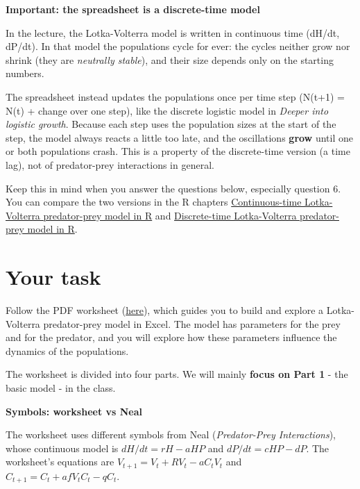 \documentclass[
  a4paper]{book}
\begin{document}
\textbf{Important: the spreadsheet is a discrete-time model}

In the lecture, the Lotka-Volterra model is written in continuous time (dH/dt, dP/dt). In that model the populations cycle for ever: the cycles neither grow nor shrink (they are \emph{neutrally stable}), and their size depends only on the starting numbers.

The spreadsheet instead updates the populations once per time step (N(t+1) = N(t) + change over one step), like the discrete logistic model in \emph{Deeper into logistic growth}. Because each step uses the population sizes at the start of the step, the model always reacts a little too late, and the oscillations \textbf{grow} until one or both populations crash. This is a property of the discrete-time version (a time lag), not of predator-prey interactions in general.

Keep this in mind when you answer the questions below, especially question 6. You can compare the two versions in the R chapters \href{continuous-time-lotka-volterra-predator-prey-model-in-r.html}{Continuous-time Lotka-Volterra predator-prey model in R} and \href{discrete-time-lotka-volterra-predator-prey-model-in-r.html}{Discrete-time Lotka-Volterra predator-prey model in R}.

\section{Your task}\label{your-task-18}

Follow the PDF worksheet (\href{https://www.dropbox.com/s/bhwoe161wp9p6hp/10.\%20Predator-prey\%20dynamics.pdf?dl=1}{here}), which guides you to build and explore a Lotka-Volterra predator-prey model in Excel. The model has parameters for the prey and for the predator, and you will explore how these parameters influence the dynamics of the populations.

The worksheet is divided into four parts. We will mainly \textbf{focus on Part 1} - the basic model - in the class.

\textbf{Symbols: worksheet vs Neal}

The worksheet uses different symbols from Neal (\emph{Predator-Prey Interactions}), whose continuous model is \(dH/dt = rH - aHP\) and \(dP/dt = cHP - dP\). The worksheet's equations are \(V_{t+1} = V_t + RV_t - aC_tV_t\) and \(C_{t+1} = C_t + afV_tC_t - qC_t\).
\end{document}
